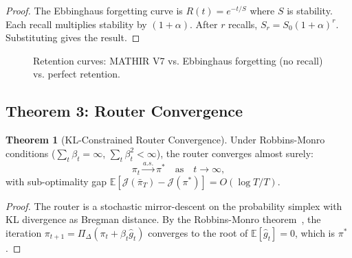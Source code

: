 \documentclass[12pt,a4paper]{article}
\theoremstyle{definition}
\newtheorem{theorem}{Theorem}[section]
\theoremstyle{remark}
\newcommand{\MATHIR}{\textsc{MATHIR}}
\newcommand{\E}{\mathbb{E}}
\begin{document}
\begin{proof}
The Ebbinghaus forgetting curve is $R(t) = e^{-t/S}$ where $S$ is stability. Each recall multiplies stability by $(1+\alpha)$. After $r$ recalls, $S_r = S_0 (1+\alpha)^r$. Substituting gives the result.
\end{proof}

\begin{figure}[H]
\centering
{}
\caption{Retention curves: \MATHIR{} V7 vs. Ebbinghaus forgetting (no recall) vs. perfect retention.}
\label{fig:retention}
\end{figure}

\subsection{Theorem 3: Router Convergence}

\begin{theorem}[KL-Constrained Router Convergence]
\label{thm:router}
Under Robbins-Monro conditions ($\sum_t \beta_t = \infty$, $\sum_t \beta_t^2 < \infty$), the router converges almost surely:
\begin{equation}
    \pi_t \xrightarrow{a.s.} \pi^* \quad \text{as} \quad t \to \infty,
\end{equation}
with sub-optimality gap $\E[\mathcal{J}(\bar{\pi}_T) - \mathcal{J}(\pi^*)] = O(\log T / T)$.
\end{theorem}

\begin{proof}
The router is a stochastic mirror-descent on the probability simplex with KL divergence as Bregman distance. By the Robbins-Monro theorem~\cite{robbins1951}, the iteration $\pi_{t+1} = \Pi_{\Delta}(\pi_t + \beta_t \hat{g}_t)$ converges to the root of $\E[\hat{g}_t] = 0$, which is $\pi^*$.
\end{proof}
\end{document}
